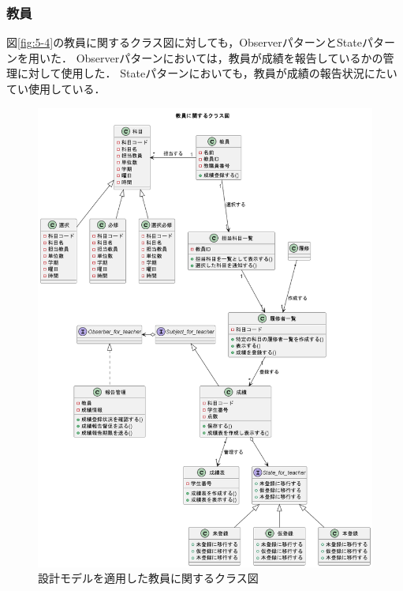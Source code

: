 \documentclass[documentclass]{jsarticle}
\begin{document}
\subsubsection*{教員}
図\ref*{fig:5-4}の教員に関するクラス図に対しても，ObserverパターンとStateパターンを用いた．
Observerパターンにおいては，教員が成績を報告しているかの管理に対して使用した．
Stateパターンにおいても，教員が成績の報告状況にたいてい使用している．
\begin{figure}[H]
  \begin{center}
    \includegraphics*[scale=0.4]{figure/9-4.png}
  \end{center}
  \caption{設計モデルを適用した教員に関するクラス図}
  \label{fig:9-4}
\end{figure}
\end{document}
